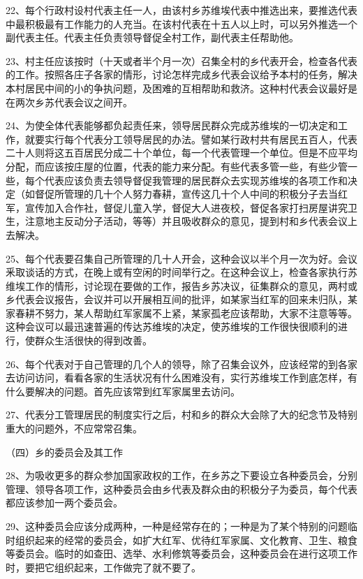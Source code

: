 22、每个行政村设村代表主任一人，由该村乡苏维埃代表中推选出来，要推选代表中最积极最有工作能力的人充当。在该村代表在十五人以上时，可以另外推选一个副代表主任。代表主任负责领导督促全村工作，副代表主任帮助他。

23、村主任应该按时（十天或者半个月一次）召集全村的乡代表开会，检查各代表的工作。按照各庄子各家的情形，讨论怎样完成乡代表会议给予本村的任务，解决本村居民中间的小的争执问题，及困难的互相帮助和救济。这种村代表会议最好是在两次乡苏代表会议之间开。

24、为使全体代表能够都负起责任来，领导居民群众完成苏维埃的一切决定和工作，就要实行每个代表分工领导居民的办法。譬如某行政村共有居民五百人，代表二十人则将这五百居民分成二十个单位，每一个代表管理一个单位。但是不应平均分配，而应该按庄屋的位置，代表的能力来分配。有些代表多管一些，有些少管一些，每个代表应该负责去领导督促我管理的居民群众去实现苏维埃的各项工作和决定（如督促所管理的几十个人努力春耕，宣传这几十个人中间的积极分子去当红军，宣传加入合作社，督促儿童入学，督促大人进夜校，督促各家打扫房屋讲究卫生，注意地主反动分子活动，等等）并且吸收群众的意见，提到村和乡代表会议上去解决。

25、每个代表要召集自己所管理的几十人开会，这种会议以半个月一次为好。会议釆取谈话的方式，在晚上或有空闲的时间举行之。在这种会议上，检查各家执行苏维埃工作的情形，讨论现在要做的工作，报告乡苏决议，征集群众的意见，两村或乡代表会议报告，会议并可以开展相互间的批评，如某家当红军的回来未归队，某家春耕不努力，某人帮助红军家属不上紧，某家孤老应该帮助，大家不注意等等。这种会议可以最迅速普遍的传达苏维埃的决定，使苏维埃的工作很快很顺利的进行，使群众生活很快的得到改善。

26、每个代表对于自己管理的几个人的领导，除了召集会议外，应该经常的到各家去访问访问，看看各家的生活状况有什么困难没有，实行苏维埃工作到底怎样，有什么要解决的问题。首先应该常到红军家属里去访问。

27、代表分工管理居民的制度实行之后，村和乡的群众大会除了大的纪念节及特别重大的问题外，不应常常召集。

（四）乡的委员会及其工作

28、为吸收更多的群众参加国家政权的工作，在乡苏之下要设立各种委员会，分别管理、领导各项工作，这种委员会由乡代表及群众由的积极分子为委员，每个代表都应该参加一两个委员会。

29、这种委员会应该分成两种，一种是经常存在的；一种是为了某个特别的问题临时组织起来的经常的委员会，如扩大红军、优待红军家属、文化教育、卫生、粮食等委员会。临时的如查田、选举、水利修筑等委员会，这种委员会在进行这项工作时，要把它组织起来，工作做完了就不要了。

